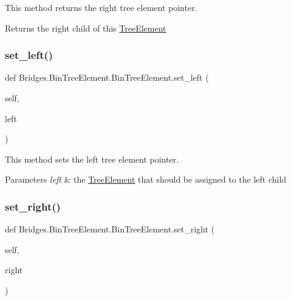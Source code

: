 This method returns the right tree element pointer. 

\begin{DoxyReturn}{Returns}
the right child of this \mbox{\hyperlink{namespace_bridges_1_1_tree_element}{Tree\+Element}} 
\end{DoxyReturn}
\mbox{\label{class_bridges_1_1_bin_tree_element_1_1_bin_tree_element_aa3d0afa18e6b058b4b1d8625ca6eca9a}} 
\subsubsection{\texorpdfstring{set\+\_\+left()}{set\_left()}}
{\footnotesize\ttfamily def Bridges.\+Bin\+Tree\+Element.\+Bin\+Tree\+Element.\+set\+\_\+left (\begin{DoxyParamCaption}\item[{}]{self,  }\item[{}]{left }\end{DoxyParamCaption})}



This method sets the left tree element pointer. 


\begin{DoxyParams}{Parameters}
{\em left} & the \mbox{\hyperlink{namespace_bridges_1_1_tree_element}{Tree\+Element}} that should be assigned to the left child \\
\hline
\end{DoxyParams}
\mbox{\label{class_bridges_1_1_bin_tree_element_1_1_bin_tree_element_ac93c9e5553a10645c6157a14fe85dda6}} 
\subsubsection{\texorpdfstring{set\+\_\+right()}{set\_right()}}
{\footnotesize\ttfamily def Bridges.\+Bin\+Tree\+Element.\+Bin\+Tree\+Element.\+set\+\_\+right (\begin{DoxyParamCaption}\item[{}]{self,  }\item[{}]{right }\end{DoxyParamCaption})}



